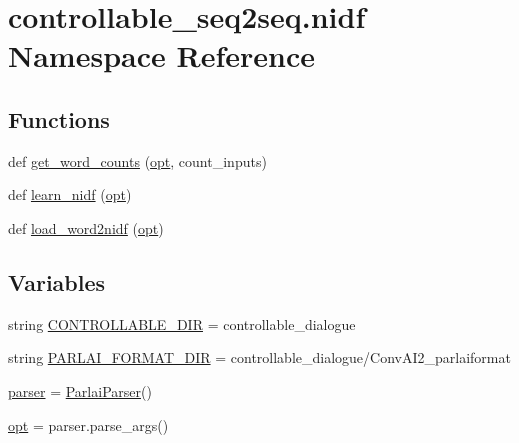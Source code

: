 \hypertarget{namespacecontrollable__seq2seq_1_1nidf}{}\section{controllable\+\_\+seq2seq.\+nidf Namespace Reference}
\label{namespacecontrollable__seq2seq_1_1nidf}
\subsection*{Functions}
\begin{DoxyCompactItemize}
\item 
def \hyperlink{namespacecontrollable__seq2seq_1_1nidf_a37a19098963f0cd702448fb479fbe37d}{get\+\_\+word\+\_\+counts} (\hyperlink{namespacecontrollable__seq2seq_1_1nidf_aaadf427a69407624cafea339545a66cb}{opt}, count\+\_\+inputs)
\item 
def \hyperlink{namespacecontrollable__seq2seq_1_1nidf_af8dba0db3cab81647b00a17f0a153ad3}{learn\+\_\+nidf} (\hyperlink{namespacecontrollable__seq2seq_1_1nidf_aaadf427a69407624cafea339545a66cb}{opt})
\item 
def \hyperlink{namespacecontrollable__seq2seq_1_1nidf_abeea1f9ad5a454af61b4744b6fcc553f}{load\+\_\+word2nidf} (\hyperlink{namespacecontrollable__seq2seq_1_1nidf_aaadf427a69407624cafea339545a66cb}{opt})
\end{DoxyCompactItemize}
\subsection*{Variables}
\begin{DoxyCompactItemize}
\item 
string \hyperlink{namespacecontrollable__seq2seq_1_1nidf_a6ed61d865a129090fe559cdfcf6fb6a0}{C\+O\+N\+T\+R\+O\+L\+L\+A\+B\+L\+E\+\_\+\+D\+IR} = \textquotesingle{}controllable\+\_\+dialogue\textquotesingle{}
\item 
string \hyperlink{namespacecontrollable__seq2seq_1_1nidf_a8a8d53a423e92dbd9d85a5d827ef6892}{P\+A\+R\+L\+A\+I\+\_\+\+F\+O\+R\+M\+A\+T\+\_\+\+D\+IR} = \textquotesingle{}controllable\+\_\+dialogue/Conv\+A\+I2\+\_\+parlaiformat\textquotesingle{}
\item 
\hyperlink{namespacecontrollable__seq2seq_1_1nidf_a10a29eb100088c18e46c792f257e5f1c}{parser} = \hyperlink{classparlai_1_1core_1_1params_1_1ParlaiParser}{Parlai\+Parser}()
\item 
\hyperlink{namespacecontrollable__seq2seq_1_1nidf_aaadf427a69407624cafea339545a66cb}{opt} = parser.\+parse\+\_\+args()
\end{DoxyCompactItemize}


